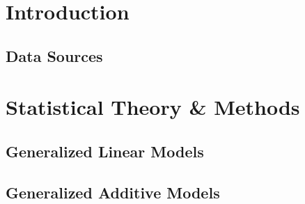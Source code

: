\documentclass[12pt]{article}
\numberwithin{equation}{section}
\numberwithin{table}{section}
\numberwithin{figure}{section}
\begin{document}
\thispagestyle{empty}	



%

%



%


	
\thispagestyle{empty}
\tableofcontents
\newpage




\newpage

\setcounter{page}{1} 

\section{Introduction} \label{sec:introduction}

\subsection{Data Sources} \label{ssec:data_sources}

\clearpage

\section{Statistical Theory \& Methods} \label{sec:theory_and_methods}

\subsection{Generalized Linear Models} \label{ssec:glm}

\subsection{Generalized Additive Models} \label{sec:gam}
\end{document}
